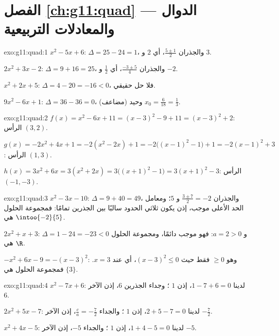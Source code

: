 \section*{الفصل \ref{ch:g11:quad} --- الدوال والمعادلات التربيعية}

\begin{solution}{exo:g11:quad:1}
$x^2-5x+6$: $\Delta = 25 - 24 = 1$، والجذران $\frac{5 \pm 1}{2}$، أي $2$
و $3$.

$2x^2+3x-2$: $\Delta = 9 + 16 = 25$، والجذران $\frac{-3 \pm 5}{4}$، أي
$\frac12$ و $-2$.

$x^2+2x+5$: $\Delta = 4 - 20 = -16 < 0$، فلا حل حقيقي.

$9x^2-6x+1$: $\Delta = 36 - 36 = 0$،  وحيد (مضاعف)
$x_0 = \frac{6}{18} = \frac13$.
\end{solution}

\begin{solution}{exo:g11:quad:2}
$f(x) = x^2 - 6x + 11 = (x-3)^2 - 9 + 11 = (x-3)^2 + 2$: الرأس $(3, 2)$.

$g(x) = -2x^2+4x+1 = -2(x^2 - 2x) + 1 = -2\bigl((x-1)^2 - 1\bigr) + 1
= -2(x-1)^2 + 3$: الرأس $(1, 3)$.

$h(x) = 3x^2 + 6x = 3(x^2 + 2x) = 3\bigl((x+1)^2 - 1\bigr)
= 3(x+1)^2 - 3$: الرأس $(-1, -3)$.
\end{solution}

\begin{solution}{exo:g11:quad:3}
$x^2 - 3x - 10$: $\Delta = 9 + 40 = 49$، والجذران $\frac{3 \pm 7}{2} = -2$
و $5$؛ ومعامل الحد الأعلى موجب، إذن يكون ثلاثي الحدود سالبًا
بين الجذرين تمامًا: فمجموعة الحلول هي $\intoo{-2}{5}$.

$2x^2 + x + 3$: $\Delta = 1 - 24 = -23 < 0$ و $a = 2 > 0$: فهو موجب
دائمًا، ومجموعة الحلول هي $\R$.

$-x^2 + 6x - 9 = -(x-3)^2$: وهو $\geq 0$ فقط حيث $(x-3)^2 \leq 0$،
أي عند $x = 3$. فمجموعة الحلول هي $\{3\}$.
\end{solution}

\begin{solution}{exo:g11:quad:4}
$x^2 - 7x + 6$: لدينا $1 - 7 + 6 = 0$، إذن $1$ ؛ وجداء
الجذرين $6$، إذن  الآخر $6$.

$2x^2 + 5x - 7$: لدينا $2 + 5 - 7 = 0$، إذن $1$ ؛ والجداء
$\frac{c}{a} = -\frac72$، إذن  الآخر $-\frac72$.

$x^2 + 4x - 5$: لدينا $1 + 4 - 5 = 0$، إذن $1$ ؛ والجداء $-5$، إذن
 الآخر $-5$.
\end{solution}


